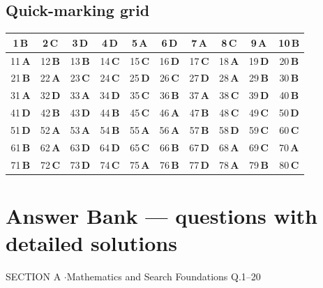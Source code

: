 \documentclass[11pt,a4paper]{article}
\begin{document}
\subsection*{Quick-marking grid}
\begin{center}\renewcommand{\arraystretch}{1.3}
\begin{tabular}{|c|c|c|c|c|c|c|c|c|c|}\hline
1\,\textbf{B} & 2\,\textbf{C} & 3\,\textbf{D} & 4\,\textbf{D} & 5\,\textbf{A} & 6\,\textbf{D} & 7\,\textbf{A} & 8\,\textbf{C} & 9\,\textbf{A} & 10\,\textbf{B} \\
\hline
11\,\textbf{A} & 12\,\textbf{B} & 13\,\textbf{B} & 14\,\textbf{C} & 15\,\textbf{C} & 16\,\textbf{D} & 17\,\textbf{C} & 18\,\textbf{A} & 19\,\textbf{D} & 20\,\textbf{B} \\
\hline
21\,\textbf{B} & 22\,\textbf{A} & 23\,\textbf{C} & 24\,\textbf{C} & 25\,\textbf{D} & 26\,\textbf{C} & 27\,\textbf{D} & 28\,\textbf{A} & 29\,\textbf{B} & 30\,\textbf{B} \\
\hline
31\,\textbf{A} & 32\,\textbf{D} & 33\,\textbf{A} & 34\,\textbf{D} & 35\,\textbf{C} & 36\,\textbf{B} & 37\,\textbf{A} & 38\,\textbf{C} & 39\,\textbf{D} & 40\,\textbf{B} \\
\hline
41\,\textbf{D} & 42\,\textbf{B} & 43\,\textbf{D} & 44\,\textbf{B} & 45\,\textbf{C} & 46\,\textbf{A} & 47\,\textbf{B} & 48\,\textbf{C} & 49\,\textbf{C} & 50\,\textbf{D} \\
\hline
51\,\textbf{D} & 52\,\textbf{A} & 53\,\textbf{A} & 54\,\textbf{B} & 55\,\textbf{A} & 56\,\textbf{A} & 57\,\textbf{B} & 58\,\textbf{D} & 59\,\textbf{C} & 60\,\textbf{C} \\
\hline
61\,\textbf{B} & 62\,\textbf{A} & 63\,\textbf{D} & 64\,\textbf{D} & 65\,\textbf{C} & 66\,\textbf{B} & 67\,\textbf{D} & 68\,\textbf{A} & 69\,\textbf{C} & 70\,\textbf{A} \\
\hline
71\,\textbf{B} & 72\,\textbf{C} & 73\,\textbf{D} & 74\,\textbf{C} & 75\,\textbf{A} & 76\,\textbf{B} & 77\,\textbf{D} & 78\,\textbf{A} & 79\,\textbf{B} & 80\,\textbf{C} \\
\hline\end{tabular}\end{center}
\newpage
\section*{Answer Bank --- questions with detailed solutions}\label{bank}

\begin{sectionbanner}SECTION A \enspace$\cdot$\enspace Mathematics and Search Foundations \hfill Q.1--20\end{sectionbanner}
\end{document}
